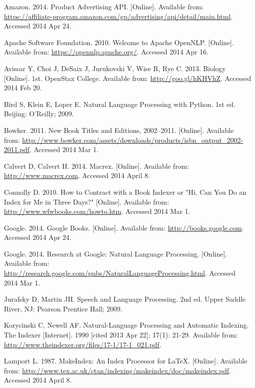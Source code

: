 \begin{thebibliography}{99}

Amazon. 2014. Product Advertising API. [Online]. Available from: \url{https://affiliate-program.amazon.com/gp/advertising/api/detail/main.html}. Accessed 2014 Apr 24.

Apache Software Foundation. 2010. Welcome to Apache OpenNLP. [Online]. Available from: \url{https://opennlp.apache.org/}. Accessed 2014 Apr 16.

Avissar Y, Choi J, DeSaix J, Jurukovski V, Wise R, Rye C. 2013. Biology [Online]. 1st. OpenStax College. Available from: \url{http://goo.gl/hKHVhZ}. Accessed 2014 Feb 20.

Bird S, Klein E, Loper E. Natural Language Processing with Python. 1st ed. Beijing: O'Reilly; 2009.

Bowker. 2011. New Book Titles and Editions, 2002--2011. [Online]. Available from: \url{http://www.bowker.com/assets/downloads/products/isbn_output_2002-2011.pdf}. Accessed 2014 Mar 1.

Calvert D, Calvert H. 2014. Macrex. [Online]. Available from: \url{http://www.macrex.com}. Accessed 2014 April 8.

Connolly D. 2010. How to Contract with a Book Indexer or "Hi, Can You Do an Index for Me in Three Days?" [Online]. Available from: \url{http://www.wfwbooks.com/howto.htm}. Accessed 2014 Mar 1.

Google. 2014. Google Books. [Online]. Available from: \url{http://books.google.com}. Accessed 2014 Apr 24.

Google. 2014. Research at Google: Natural Language Processing. [Online]. Available from: \url{http://research.google.com/pubs/NaturalLanguageProcessing.html}. Accessed 2014 Mar 1.

Jurafsky D, Martin JH. Speech and Language Processing. 2nd ed. Upper Saddle River, NJ: Pearson Prentice Hall; 2009.

Korycinski C, Newell AF. Natural-Language Processing and Automatic Indexing. The Indexer [Internet]. 1990 [cited 2013 Apr 22]; 17(1): 21-29. Available from: \url{http://www.theindexer.org/files/17-1/17-1_021.pdf}.

Lamport L. 1987. MakeIndex: An Index Processor for \LaTeX. [Online]. Available from: \url{http://www.tex.ac.uk/ctan/indexing/makeindex/doc/makeindex.pdf}. Accessed 2014 April 8.


\end{thebibliography}
